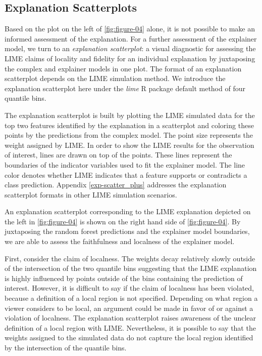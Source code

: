 \documentclass[AMS,STIX2COL]{WileyNJD-v2}\usepackage[]{graphicx}\usepackage[]{color}
\begin{document}
\subsection{Explanation Scatterplots} \label{exp-scatter}

Based on the plot on the left of \autoref{fig:figure-04} alone, it is not possible to make an informed assessment of the explanation. For a further assessment of the explainer model, we turn to an \emph{explanation scatterplot}: a visual diagnostic for assessing the LIME claims of locality and fidelity for an individual explanation by juxtaposing the complex and explainer models in one plot. The format of an explanation scatterplot depends on the LIME simulation method. We introduce the explanation scatterplot here under the \emph{lime} R package default method of four quantile bins.

The explanation scatterplot is built by plotting the LIME simulated data for the top two features identified by the explanation in a scatterplot and coloring these points by the  predictions from the complex model. The point size  represents the weight assigned by LIME. In order to show the LIME results for the observation of interest, lines are drawn on top of the points. These lines  represent the boundaries of the indicator variables used to fit the explainer model. The line color  denotes whether LIME indicates that a feature supports or contradicts a class prediction. Appendix \ref{exp-scatter_plus} addresses the explanation scatterplot formats in other LIME simulation scenarios.

An explanation scatterplot corresponding to the LIME explanation depicted on the left in \autoref{fig:figure-04} is shown on the right hand side of \autoref{fig:figure-04}. By juxtaposing the random forest predictions and the explainer model boundaries, we are able to assess the faithfulness and localness of the explainer model. 

First, consider the claim of localness. The weights decay relatively slowly  outside of the intersection of the two quantile bins suggesting that the LIME explanation is highly influenced by points outside of the bins containing the prediction of interest. However, it is  difficult to say if the claim of localness has been violated, because a definition of a local region is not specified. Depending on what region a viewer considers to be local, an argument could be made in favor of or against a violation of localness. The explanation scatterplot raises awareness of the unclear definition of a local region with LIME. Nevertheless, it is possible to say that the weights assigned to the simulated data do not capture  the local region identified by the intersection of the quantile bins. 
\end{document}
